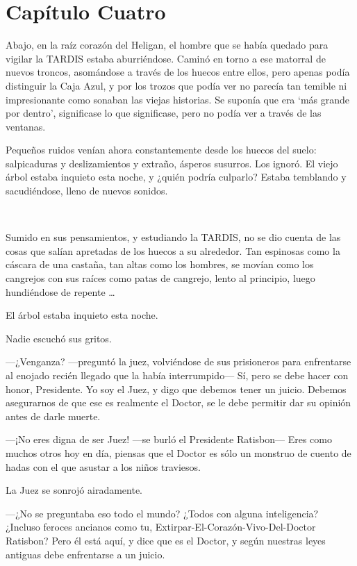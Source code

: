 \chapter*{Capítulo Cuatro}

Abajo, en la raíz corazón del Heligan, el hombre que se había quedado
para vigilar la TARDIS estaba aburriéndose. Caminó en torno a ese
matorral de nuevos troncos, asomándose a través de los huecos entre
ellos, pero apenas podía distinguir la Caja Azul, y por los trozos que
podía ver no parecía tan temible ni impresionante como sonaban las
viejas historias. Se suponía que era `más grande por dentro',
significase lo que significase, pero no podía ver a través de las
ventanas.

Pequeños ruidos venían ahora constantemente desde los huecos del suelo:
salpicaduras y deslizamientos y extraño, ásperos susurros. Los ignoró.
El viejo árbol estaba inquieto esta noche, y ¿quién podría culparlo?
Estaba temblando y sacudiéndose, lleno de nuevos sonidos.

~

Sumido en sus pensamientos, y estudiando la TARDIS, no se dio cuenta de
las cosas que salían apretadas de los huecos a su alrededor. Tan
espinosas como la cáscara de una castaña, tan altas como los hombres, se
movían como los cangrejos con sus raíces como patas de cangrejo, lento
al principio, luego hundiéndose de repente \ldots{}

El árbol estaba inquieto esta noche.

Nadie escuchó sus gritos.

---¿Venganza? ---preguntó la juez, volviéndose de sus prisioneros para
enfrentarse al enojado recién llegado que la había interrumpido--- Sí,
pero se debe hacer con honor, Presidente. Yo soy el Juez, y digo que
debemos tener un juicio. Debemos asegurarnos de que ese es realmente el
Doctor, se le debe permitir dar su opinión antes de darle muerte.

---¡No eres digna de ser Juez! ---se burló el Presidente Ratisbon---
Eres como muchos otros hoy en día, piensas que el Doctor es sólo un
monstruo de cuento de hadas con el que asustar a los niños traviesos.

La Juez se sonrojó airadamente.

---¿No se preguntaba eso todo el mundo? ¿Todos con alguna inteligencia?
¿Incluso feroces ancianos como tu, Extirpar-El-Corazón-Vivo-Del-Doctor
Ratisbon? Pero él está aquí, y dice que es el Doctor, y según nuestras
leyes antiguas debe enfrentarse a un juicio.

